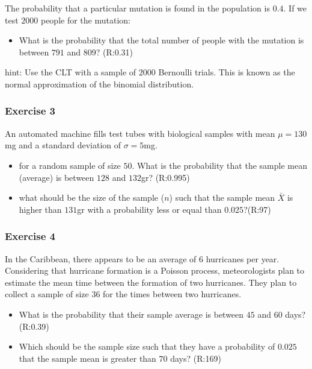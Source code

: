 \documentclass[
]{book}
\providecommand{\tightlist}{%
  \setlength{\itemsep}{0pt}\setlength{\parskip}{0pt}}
\begin{document}
The probability that a particular mutation is found in the population is \(0.4\). If we test \(2000\) people for the mutation:

\begin{itemize}
\tightlist
\item
  What is the probability that the total number of people with the mutation is between \(791\) and \(809\)? (R:0.31)
\end{itemize}

hint: Use the CLT with a sample of \(2000\) Bernoulli trials. This is known as the normal approximation of the binomial distribution.

\hypertarget{exercise-3-5}{%
\subsubsection{Exercise 3}\label{exercise-3-5}}

An automated machine fills test tubes with biological samples with mean \(\mu=130\)mg and a standard deviation of \(\sigma=5\)mg.

\begin{itemize}
\item
  for a random sample of size \(50\). What is the probability that
  the sample mean (average) is between \(128\) and \(132\)gr? (R:0.995)
\item
  what should be the size of the sample (\(n\)) such that the sample mean \(\bar{X}\) is higher than \(131\)gr with a probability less or equal than \(0.025\)?(R:97)
\end{itemize}

\hypertarget{exercise-4-3}{%
\subsubsection{Exercise 4}\label{exercise-4-3}}

In the Caribbean, there appears to be an average of \(6\) hurricanes per year. Considering that hurricane formation is a Poisson process, meteorologists plan to estimate the mean time between the formation of two hurricanes. They plan to collect a sample of size \(36\) for the times between two hurricanes.

\begin{itemize}
\item
  What is the probability that their sample average is between \(45\) and \(60\) days? (R:0.39)
\item
  Which should be the sample size such that they have a probability of \(0.025\) that the sample mean is greater than \(70\) days? (R:169)
\end{itemize}
\end{document}
